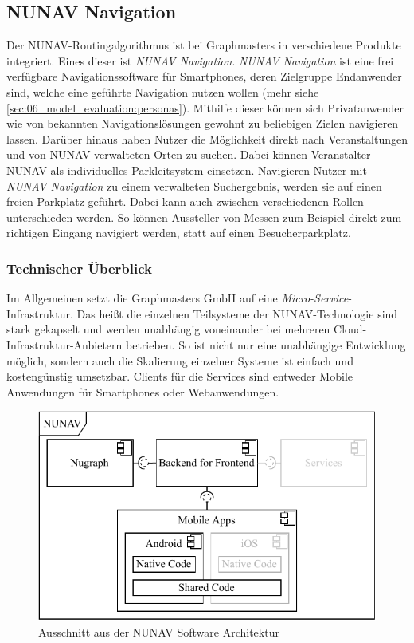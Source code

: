 \subsection{NUNAV Navigation}

Der NUNAV-Routingalgorithmus ist bei Graphmasters in verschiedene Produkte integriert. Eines dieser ist \textit{NUNAV Navigation}. \textit{NUNAV Navigation} ist eine frei verfügbare Navigationssoftware für Smartphones, deren Zielgruppe Endanwender sind, welche eine geführte Navigation nutzen wollen (mehr siehe \autoref{sec:06_model_evaluation:personas}). Mithilfe dieser können sich Privatanwender wie von bekannten Navigationslösungen gewohnt zu beliebigen Zielen navigieren lassen. Darüber hinaus haben Nutzer die Möglichkeit direkt nach Veranstaltungen und von NUNAV verwalteten Orten zu suchen. Dabei können Veranstalter NUNAV als individuelles Parkleitsystem einsetzen. Navigieren Nutzer mit \textit{NUNAV Navigation} zu einem verwalteten Suchergebnis, werden sie auf einen freien Parkplatz geführt. Dabei kann auch zwischen verschiedenen Rollen unterschieden werden. So können Aussteller von Messen zum Beispiel direkt zum richtigen Eingang navigiert werden, statt auf einen Besucherparkplatz.

\subsubsection{Technischer Überblick}

Im Allgemeinen setzt die Graphmasters GmbH auf eine \textit{Micro-Service}-Infrastruktur. Das heißt die einzelnen Teilsysteme der NUNAV-Technologie sind stark gekapselt und werden unabhängig voneinander bei mehreren Cloud-Infrastruktur-Anbietern betrieben. So ist nicht nur eine unabhängige Entwicklung möglich, sondern auch die Skalierung einzelner Systeme ist einfach und kostengünstig umsetzbar. Clients für die Services sind entweder Mobile Anwendungen für Smartphones oder Webanwendungen.

\begin{figure}[htb!]
    \centering
    \includegraphics{contents/06_model_evaluation/01_integration/res/nunav_architecture.pdf}
    \caption{Ausschnitt aus der NUNAV Software Architektur}
    \label{fig:nunav_software_architecture}
\end{figure}

